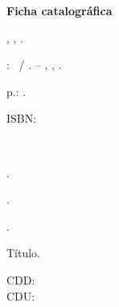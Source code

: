 \textbf{Ficha catalográfica}
\begin{center}
\begin{catalografica}%
	\myauthorlastname, \myauthorname, \myauthorborn.%

	\hspace{0.5cm} \mytitle: \mysubtitle~/ \myauthor. -- %
	\imprimirlocal, \imprimireditora, \imprimiryear.
	
	\hspace{0.5cm} \pageref{LastPage} p.: \imprimirpapersize.\\ %
	
	\hspace{0.5cm}
	\parbox[t]{\textwidth}{\imprimirtipotrabalho}%

	\hspace{0.5cm}
	\parbox[t]{\textwidth}{ISBN:\imprimirisbn}\\


	\hspace{0.5cm}
	\begin{inparaenum}[1.]
		\item \palavraschavea.
		\item \palavraschaveb.
		\item \palavraschavec.
	\end{inparaenum}
	\begin{inparaenum}[I.]
		\item Título.%
	\end{inparaenum}

    \begin{flushright}
    CDD: \imprimirCDD\\
    CDU: \imprimirCDU
    \end{flushright}
\end{catalografica}%
\end{center}
~\\


